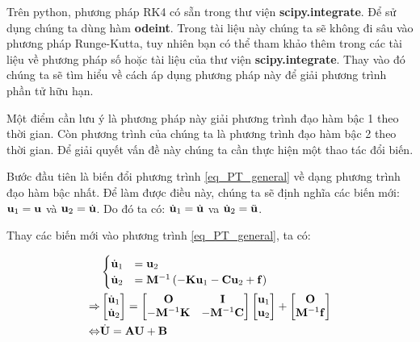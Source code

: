 Trên python, phương pháp RK4 có sẵn trong thư viện \textbf{scipy.integrate}. Để sử dụng chúng ta dùng hàm \textbf{odeint}. Trong tài liệu này chúng ta sẽ không đi sâu vào phương pháp Runge-Kutta, tuy nhiên bạn có thể tham khảo thêm trong các tài liệu về phương pháp số hoặc tài liệu của thư viện \textbf{scipy.integrate}. Thay vào đó chúng ta sẽ tìm hiểu về cách áp dụng phương pháp này để giải phương trình phần tử hữu hạn.

Một điểm cần lưu ý là phương pháp này giải phương trình đạo hàm bậc 1 theo thời gian. Còn phương trình của chúng ta là phương trình đạo hàm bậc 2 theo thời gian. Để giải quyết vấn đề này chúng ta cần thực hiện một thao tác đổi biến.

Bước đầu tiên là biến đổi phương trình \cref{eq_PT_general} về dạng phương trình đạo hàm bậc nhất. Để làm được điều này, chúng ta sẽ định nghĩa các biến mới: ${\bf u}_1 = {\bf u}$ và ${\bf u}_2 = \dot{\bf u}$. Do đó ta có: $\dot{\bf u}_1 = \dot{\bf u}$ va $\dot{\bf u}_2 = \ddot{\bf u}$.

Thay các biến mới vào phương trình \cref{eq_PT_general}, ta có:

\begin{equation}
    \begin{aligned}
    &\begin{cases}
        \dot{\bf u}_1 &= {\bf u}_2 \\
        \dot{\bf u}_2 &= {\bf M}^{-1}\left(-{\bf K}{\bf u}_1-{\bf C}{\bf u}_2 + {\bf f}\right)
    \end{cases} \\
    \Rightarrow &\begin{bmatrix}
        \dot{\bf u}_1 \\ \dot{\bf u}_2
    \end{bmatrix} = \begin{bmatrix}
        {\bf O} & {\bf I} \\
        -{\bf M}^{-1}{\bf K} & -{\bf M}^{-1}{\bf C}
    \end{bmatrix}\begin{bmatrix}
        {\bf u}_1 \\ {\bf u}_2
    \end{bmatrix} + \begin{bmatrix}
        {\bf O} \\ {\bf M}^{-1}{\bf f}
    \end{bmatrix} \\
    \Leftrightarrow & \dot{\bf U} = {\bf A} {\bf U} + {\bf B}
    \end{aligned}
\end{equation}

